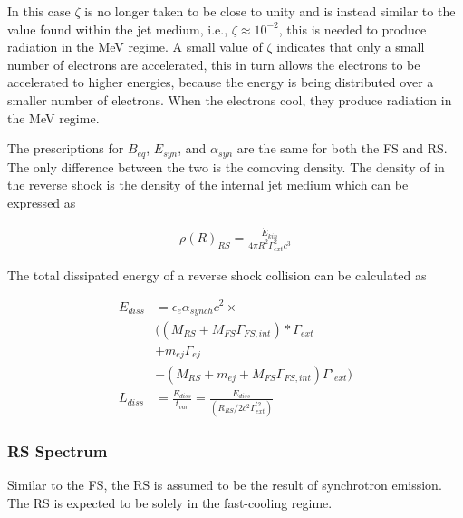 \documentclass[linenumbers,twocolumn]{aastex631}
\begin{document}
In this case $\zeta$ is no longer taken to be close to unity and is instead similar to the value found within the jet medium, i.e., $\zeta \approx 10^{-2}$, this is needed to produce radiation in the MeV regime. A small value of $\zeta$ indicates that only a small number of electrons are accelerated, this in turn allows the electrons to be accelerated to higher energies, because the energy is being distributed over a smaller number of electrons. When the electrons cool, they produce radiation in the MeV regime.

The prescriptions for $B_{eq}$, $E_{syn}$, and $\alpha_{syn}$ are the same for both the FS and RS. The only difference between the two is the comoving density. The density of in the reverse shock is the density of the internal jet medium which can be expressed as

\begin{align}
	\rho(R)_{RS} = \frac{\dot{E}_{kin}}{4\pi R^2 \Gamma_{ext}^2 c^3}
\end{align}

The total dissipated energy of a reverse shock collision can be calculated as 

\begin{align}
	E_{diss} &= \epsilon_e \alpha_{synch} c^2 \times \\
	&((M_{RS} + M_{FS}\Gamma_{FS,int})*\Gamma_{ext}\\ 
	&+ m_{ej}\Gamma_{ej}\\ 
	&- (M_{RS} + m_{ej} + M_{FS}\Gamma_{FS,int})\Gamma'_{ext})\\
	L_{diss} & = \frac{E_{diss}}{t_{var}} = \frac{E_{diss}}{(R_{RS}/2c^2\Gamma_{ext}^{'2})}
\end{align}

\subsubsection{RS Spectrum}

Similar to the FS, the RS is assumed to be the result of synchrotron emission. The RS is expected to be solely in the fast-cooling regime.



\end{document}
